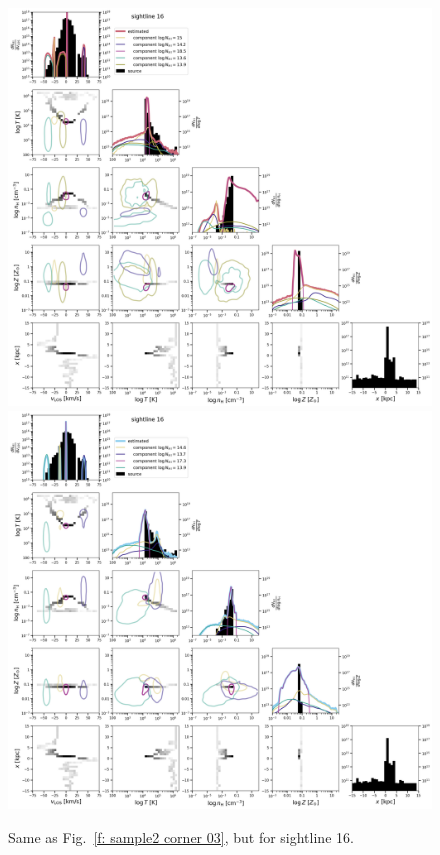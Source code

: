 \documentclass[fleqn,usenatbib]{mnras}
\begin{document}
\begin{figure}
    \centering
    \includegraphics[height=0.45\textheight]{figures/sample2/original/sightline_0016.png}
    \includegraphics[height=0.45\textheight]{figures/sample2/high-z/sightline_0016.png}
    \label{f: sample2 16 corner}
    \caption{Same as Fig.~\ref{f: sample2 corner 03}, but for sightline 16.}
\end{figure}
\end{document}
